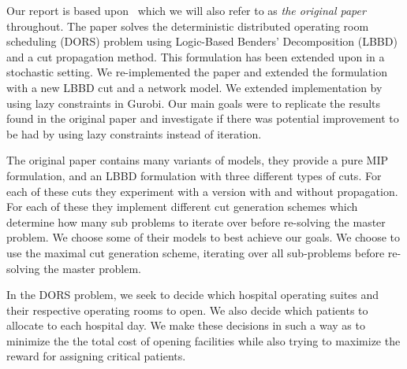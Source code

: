 Our report is based upon~\cite{roshanaei2017propagating} which we will also refer to as \textit{the original paper} throughout. The paper solves the deterministic distributed  operating room scheduling (DORS) problem using Logic-Based Benders' Decomposition (LBBD) and a cut propagation method. This formulation has been extended upon in a stochastic setting\cite{guo}. We re-implemented the paper and extended the formulation with a new LBBD cut and a network model. We extended implementation by using lazy constraints in Gurobi. Our main goals were to replicate the results found in the original paper and investigate if there was potential improvement to be had by using lazy constraints instead of iteration.

The original paper contains many variants of models, they provide a pure MIP formulation, and an LBBD formulation with three different types of cuts. For each of these cuts they experiment with a version with and without propagation. For each of these they implement different cut generation schemes which determine how many sub problems to iterate over before re-solving the master problem. We choose some of their models to best achieve our goals. We choose to use the maximal cut generation scheme, iterating over all sub-problems before re-solving the master problem.

In the DORS problem, we seek to decide which hospital operating suites and their respective operating rooms to open. We also decide which patients to allocate to each hospital day. We make these decisions in such a way as to minimize the the total cost of opening facilities while also trying to maximize the reward for assigning critical patients\cite{roshanaei2017propagating}.